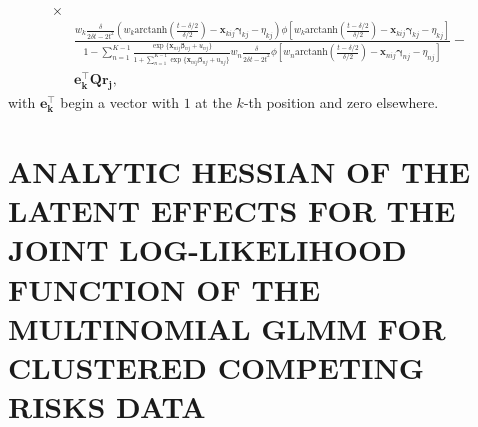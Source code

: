 \documentclass[12pt, %
               openright, %
               oneside, %
               a4paper, %
               chapter=TITLE, %
               section=TITLE, %
               brazil,
               english %
]{abntex2}
\begin{document}
\begin{apendicesenv}
\begin{align*}
    \times\\
  &\frac{
    w_{k}\frac{\delta}{2\delta t - 2t^{2}}
    (w_{k}\text{arctanh}\left(\frac{t-\delta/2}{\delta/2}\right)
    - \bm{x}_{kij}\bm{\gamma}_{kj} - \eta_{kj})
    \phi[w_{k} \text{arctanh}\left(\frac{t-\delta/2}{\delta/2}\right)
    - \bm{x}_{kij}\bm{\gamma}_{kj} - \eta_{kj}
    ]}{1 -
    \sum_{n = 1}^{K-1}
    \frac{\exp\{\bm{x}_{nij}\bm{\beta}_{nj} + u_{nj}\}}{1 +
    \sum_{n = 1}^{K-1}\exp\{\bm{x}_{nij}\bm{\beta}_{nj} + u_{nj}\}}
    w_{n}\frac{\delta}{2\delta t - 2t^{2}}
    \phi[w_{n}\text{arctanh}\left(\frac{t-\delta/2}{\delta/2}\right)
    - \bm{x}_{nij}\bm{\gamma}_{nj} - \eta_{nj}]} -\\
  &\bm{e_{k}^{\top}Qr_{j}},
\end{align*}
with \(\bm{e_{k}^{\top}}\) begin a vector with \(1\) at the \(k\)-th
position and zero elsewhere.

\chapter{ANALYTIC HESSIAN OF THE LATENT EFFECTS FOR THE JOINT
         LOG-LIKELIHOOD FUNCTION OF THE MULTINOMIAL GLMM FOR CLUSTERED
         COMPETING RISKS DATA}
\label{cap:appendixB}


\end{apendicesenv}
\end{document}
